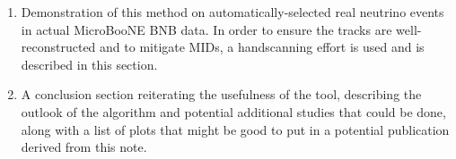 \documentclass{article}
\begin{document}
\begin{enumerate}
\item Demonstration of this method on automatically-selected real neutrino events in actual MicroBooNE BNB data. In order to ensure the tracks are well-reconstructed and to mitigate MIDs, a handscanning effort is used and is described in this section.
\item A conclusion section reiterating the usefulness of the tool, describing the outlook of the algorithm and potential additional studies that could be done, along with a list of plots that might be good to put in a potential publication derived from this note.
\end{enumerate}



\clearpage

\clearpage

\clearpage

\clearpage

\clearpage


\clearpage
\begin{appendices}

\end{appendices}

\clearpage

\end{document}
